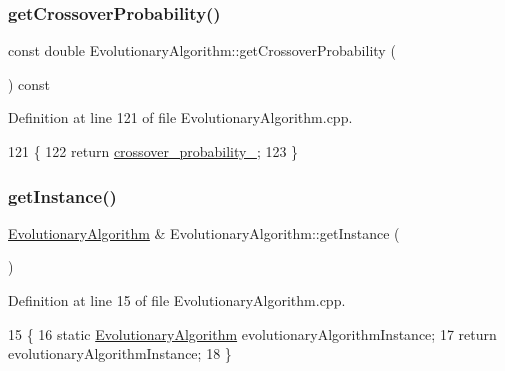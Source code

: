 \mbox{\label{classEvolutionaryAlgorithm_a71ca76fa04d0824bf7cf86b67fc65414}} 
\subsubsection{\texorpdfstring{get\+Crossover\+Probability()}{getCrossoverProbability()}}
{\footnotesize\ttfamily const double Evolutionary\+Algorithm\+::get\+Crossover\+Probability (\begin{DoxyParamCaption}{ }\end{DoxyParamCaption}) const}



Definition at line 121 of file Evolutionary\+Algorithm.\+cpp.


\begin{DoxyCode}
121                                                                   \{
122     \textcolor{keywordflow}{return} \hyperlink{classEvolutionaryAlgorithm_a815be8b2644e2d1bdc6378c88ab03da3}{crossover\_probability\_};
123 \}
\end{DoxyCode}
\mbox{\label{classEvolutionaryAlgorithm_a306ea15ca9a4eb67b84d22c7b24ef659}} 
\subsubsection{\texorpdfstring{get\+Instance()}{getInstance()}}
{\footnotesize\ttfamily \hyperlink{classEvolutionaryAlgorithm}{Evolutionary\+Algorithm} \& Evolutionary\+Algorithm\+::get\+Instance (\begin{DoxyParamCaption}{ }\end{DoxyParamCaption})\hspace{0.3cm}{\ttfamily [static]}}



Definition at line 15 of file Evolutionary\+Algorithm.\+cpp.


\begin{DoxyCode}
15                                                           \{
16     \textcolor{keyword}{static} \hyperlink{classEvolutionaryAlgorithm}{EvolutionaryAlgorithm} evolutionaryAlgorithmInstance;
17     \textcolor{keywordflow}{return} evolutionaryAlgorithmInstance;
18 \}
\end{DoxyCode}
\mbox{\label{classEvolutionaryAlgorithm_ae2aa7a6fdbfb3a065aecdb7a5488bcc6}} 
